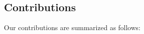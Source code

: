 \documentclass[journal]{IEEEtran}
\begin{document}


    \subsection{Contributions}

    Our contributions are summarized as follows:
\end{document}
